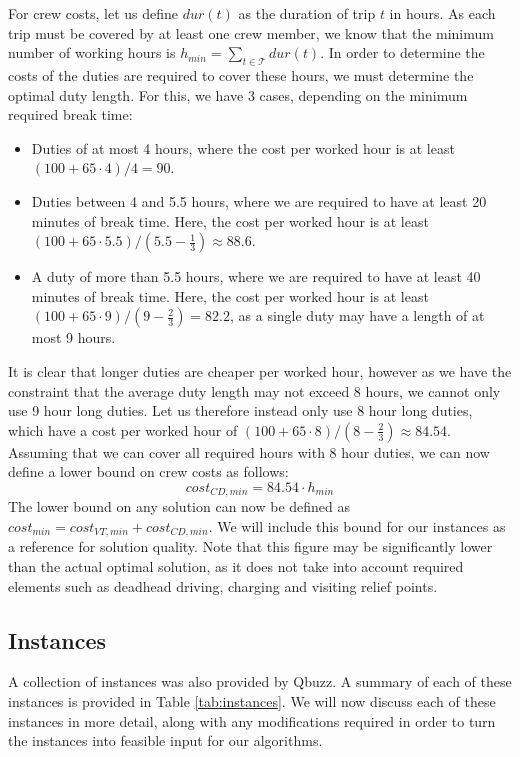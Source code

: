 \documentclass[]{article}
\begin{document}
For crew costs, let us define $dur(t)$ as the duration of trip $t$ in hours. As each trip must be covered by at least one crew member, we know that the minimum number of working hours is $h_{min} = \sum_{t \in \mathcal{T}} dur(t)$. In order to determine the costs of the duties are required to cover these hours, we must determine the optimal duty length. For this, we have 3 cases, depending on the minimum required break time: 
\begin{itemize}
  \item Duties of at most 4 hours, where the cost per worked hour is at least $(100 + 65 \cdot 4) / 4 = 90$.
  \item Duties between 4 and 5.5 hours, where we are required to have at least 20 minutes of break time. Here, the cost per worked hour is at least $(100 + 65 \cdot 5.5) / (5.5 - \frac{1}{3}) \approx 88.6$.
  \item A duty of more than 5.5 hours, where we are required to have at least 40 minutes of break time. Here, the cost per worked hour is at least $(100 + 65 \cdot 9) / (9 - \frac{2}{3}) = 82.2$, as a single duty may have a length of at most 9 hours.
\end{itemize}
It is clear that longer duties are cheaper per worked hour, however as we have the constraint that the average duty length may not exceed 8 hours, we cannot only use 9 hour long duties. Let us therefore instead only use 8 hour long duties, which have a cost per worked hour of $(100 + 65 \cdot 8) / (8 - \frac{2}{3}) \approx 84.54$. Assuming that we can cover all required hours with 8 hour duties, we can now define a lower bound on crew costs as follows:
\begin{equation}
  cost_{CD,min} = 84.54 \cdot h_{min} \nonumber
\end{equation}
The lower bound on any solution can now be defined as $cost_{min} = cost_{VT,min} + cost_{CD,min}$. We will include this bound for our instances as a reference for solution quality. Note that this figure may be significantly lower than the actual optimal solution, as it does not take into account required elements such as deadhead driving, charging and visiting relief points.

\subsection{Instances}
A collection of instances was also provided by Qbuzz. A summary of each of these instances is provided in Table \ref{tab:instances}. We will now discuss each of these instances in more detail, along with any modifications required in order to turn the instances into feasible input for our algorithms. 
\end{document}
